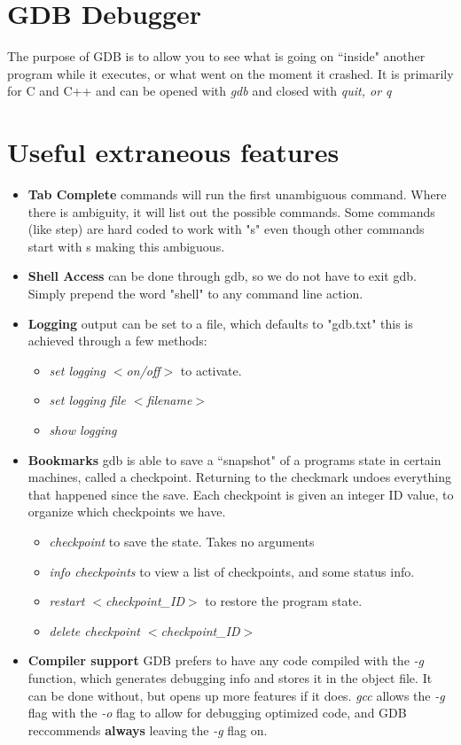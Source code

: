 \documentclass{article}
\author{Chris Wozniak}
\begin{document}
\section*{GDB Debugger}
	The purpose of GDB is to allow you to see what is going on ``inside" another program while it
	executes, or what went on the moment it crashed. It is primarily for C and C++ and can be opened with 
	\textit{gdb} and closed with \textit{quit, or q}\\

\section*{Useful extraneous features}
	\begin{itemize}
		\item \textbf{Tab Complete} commands will run the first unambiguous command. Where there is
			ambiguity, it will list out the possible commands. Some commands (like step) are hard coded
			to work with "s" even though other commands start with s making this ambiguous.
		\item \textbf{Shell Access} can be done through gdb, so we do not have to exit gdb. Simply
			prepend the word "shell" to any command line action.
		\item \textbf{Logging} output can be set to a file, which defaults to "gdb.txt" this is achieved through
			a few methods:
			\begin{itemize}
				\item \textit{set logging $<$on/off$>$} to activate.
				\item \textit{set logging file $<$filename$>$}
				\item \textit{show logging}
			\end{itemize}
		\item \textbf{Bookmarks} gdb is able to save a ``snapshot" of a programs state in certain machines, called a 
			checkpoint. Returning to the checkmark undoes everything that happened since the save. Each checkpoint is
			given an integer ID value, to organize which checkpoints we have.
			\begin{itemize}
				\item \textit{checkpoint} to save the state. Takes no arguments
				\item \textit{info checkpoints} to view a list of checkpoints, and some status info.
				\item \textit{restart $<$checkpoint\_ID$>$} to restore the program state.
				\item \textit{delete checkpoint $<$checkpoint\_ID$>$}
			\end{itemize}
		\item \textbf{Compiler support} GDB prefers to have any code compiled with the \textit{-g} function, which 
			generates debugging info and stores it in the object file. It can be done without, but opens up more 
			features if it does. \textit{gcc} allows the \textit{-g} flag with the \textit{-o} flag to allow for debugging 
			optimized code, and GDB reccommends \textbf{always} leaving the \textit{-g} flag on.
	\end{itemize}
\newpage
\end{document}
